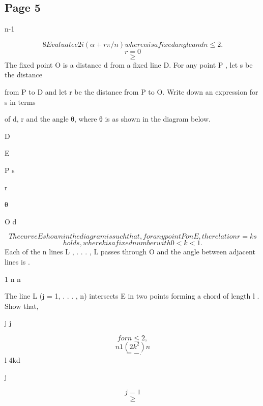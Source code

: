 \documentclass[12pt]{article}
\begin{document}
\subsection*{Page 5}
\begin{flushleft}
n-1\par
\[8 Evaluate e2i(α+r\pi/n) where α is a fixed angle and n \leq 2.\]
\[r=0\]
\[\geq\]
The fixed point O is a distance d from a fixed line D. For any point P , let s be the distance\par
from P to D and let r be the distance from P to O. Write down an expression for s in terms\par
of d, r and the angle θ, where θ is as shown in the diagram below.\par
D\par
E\par
P s\par
r\par
θ\par
O d\par
\[The curve E shown in the diagram is such that, for any point P on E, the relation r = ks\]
\[holds, where k is a fixed number with 0 < k < 1.\]
Each of the n lines L , . . . , L passes through O and the angle between adjacent lines is \pi .\par
1 n n\par
The line L (j = 1, . . . , n) intersects E in two points forming a chord of length l . Show that,\par
j j\par
\[for n \leq 2,\]
\[n 1 (2 k^2)n\]
\[= - .\]
l 4kd\par
j\par
\[j=1\]
\[\geq\]
\end{flushleft}
\end{document}
